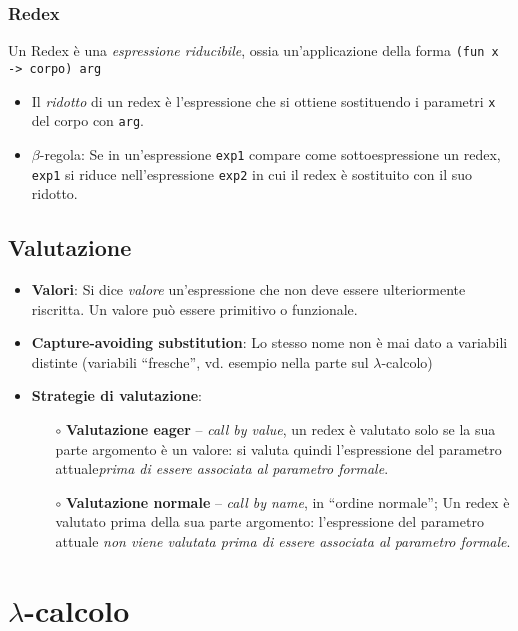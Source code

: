 \documentclass[a4paper,10pt]{article}
\begin{document}
\subsubsection{Redex}

Un Redex è una \emph{espressione riducibile}, ossia un'applicazione della forma \texttt{(fun x -> corpo) arg}
\begin{itemize}
 \item Il \emph{ridotto} di un redex è l'espressione che si ottiene sostituendo i parametri \texttt{x} del corpo con \texttt{arg}.
 \item $\beta$-regola: Se in un'espressione \texttt{exp1} compare come sottoespressione un redex, \texttt{exp1} si riduce nell'espressione \texttt{exp2} in cui il redex è sostituito con il suo ridotto.
\end{itemize}
\newpage
\subsection{Valutazione}
\begin{itemize}
 \item \textbf{Valori}: Si dice \emph{valore} un'espressione che non deve essere ulteriormente riscritta. Un valore può essere primitivo o funzionale.
 \item \textbf{Capture-avoiding substitution}: Lo stesso nome non è mai dato a variabili distinte (variabili ``fresche'', vd. esempio nella parte sul $\lambda$-calcolo)
 \item \textbf{Strategie di valutazione}: 
 \begin{itemize}
  \item[$\circ$] \textbf{Valutazione eager} -- \emph{call by value}, un redex è valutato solo se la sua parte argomento è un valore: si valuta quindi l'espressione del parametro attuale\emph{prima di essere associata al parametro formale}.
  \item[$\circ$] \textbf{Valutazione normale} -- \emph{call by name}, in ``ordine normale''; Un redex è valutato prima della sua parte argomento: l'espressione del parametro attuale \emph{non viene valutata
prima di essere associata al parametro formale}.
 \end{itemize}

\end{itemize}

\section{$\lambda$-calcolo}
\end{document}
